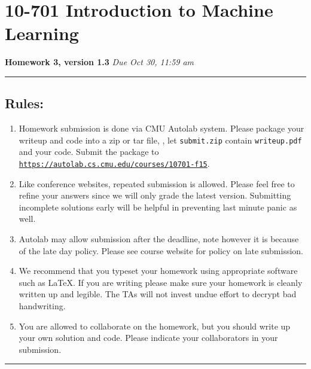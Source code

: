 \documentclass{article}
\begin{document}
\section*{10-701 Introduction to Machine Learning}
{\large \bf Homework 3, {\color{red} version 1.3}}
\hfill {\it Due Oct 30, 11:59 am}

\noindent\rule{\textwidth}{1pt}

\vspace{5ex}
\subsection*{Rules:}
\vspace{2ex}

\begin{enumerate}
\item Homework submission is done via CMU Autolab system.
Please package your writeup and code into a zip or tar file, \eg, let {\tt submit.zip} contain {\tt writeup.pdf} and your code.
Submit the package to  {\tt \href{https://autolab.cs.cmu.edu/courses/10701-f15}{https://autolab.cs.cmu.edu/courses/10701-f15}}.


\item Like conference websites, repeated submission is allowed.
Please feel free to refine your answers since
we will only grade the latest version.
Submitting incomplete solutions early will be helpful in preventing last minute panic as well.


\item Autolab may allow submission after the deadline, note however it is because of the late day policy. Please see course website for policy on late submission.

\item We recommend that you typeset your homework using appropriate software such as \LaTeX. If you are writing please make sure your homework is cleanly written up and legible. The TAs will not invest undue effort to decrypt bad handwriting.

\item You are allowed to collaborate on the homework, but you should write up your own solution and code. Please indicate your collaborators in your submission.

\end{enumerate}

\vspace{7ex}

\noindent\rule{\textwidth}{1pt}
\newpage






\end{document}
